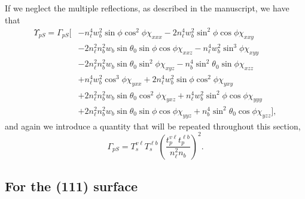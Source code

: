 If we neglect the multiple reflections, as described in the manuscript, we have
that
\begin{equation}\label{eqapp:rpsfull}
\begin{split}
\Upsilon_{pS}
= 
\Gamma_{pS}
\big[
&- n^{4}_{\ell}w^{2}_{b}\sin\phi\cos^{2}\phi\chi_{xxx}
 - 2n^{4}_{\ell}w^{2}_{b}\sin^{2}\phi\cos\phi\chi_{xxy}\\
&- 2n^{2}_{\ell}n^{2}_{b}w_{b}\sin\theta_{0}\sin\phi\cos\phi\chi_{xxz}
 - n^{4}_{\ell}w^{2}_{b}\sin^{3}\phi\chi_{xyy}\\
&- 2n^{2}_{\ell}n^{2}_{b}w_{b}\sin\theta_{0}\sin^{2}\phi\chi_{xyz}
 - n^{4}_{b}\sin^{2}\theta_{0}\sin\phi\chi_{xzz}\\
&+ n^{4}_{\ell}w^{2}_{b}\cos^{3}\phi\chi_{yxx}
 + 2n^{4}_{\ell}w^{2}_{b}\sin\phi\cos^{2}\phi\chi_{yxy}\\
&+ 2n^{2}_{\ell}n^{2}_{b}w_{b}\sin\theta_{0}\cos^{2}\phi\chi_{yxz}
 + n^{4}_{\ell}w^{2}_{b}\sin^{2}\phi\cos\phi\chi_{yyy}\\
&+ 2n^{2}_{\ell}n^{2}_{b}w_{b}\sin\theta_{0}\sin\phi\cos\phi\chi_{yyz}
 + n^{4}_{b}\sin^{2}\theta_{0}\cos\phi\chi_{yzz}
\big],
\end{split}
\end{equation}
and again we introduce a quantity that will be repeated throughout this section,
\begin{equation}\label{eqapp:gammaps}
\Gamma_{pS} =
T^{v\ell}_{s}T^{\ell b}_{s}\left(\frac{t^{v\ell}_{p}t^{\ell b}_{p}}
      {n^{2}_{\ell}n_{b}}\right)^{2}.
\end{equation}


\subsection{For the (111) surface}


